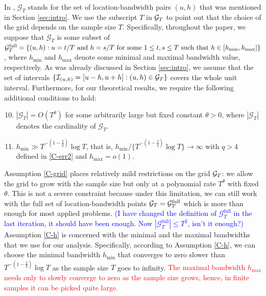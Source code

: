 \documentclass[a4paper,12pt]{article}
\makeatletter
\renewcommand{\eqref}[1]{\tagform@{\ref{#1}}}
\makeatother
\begin{document}
In \eqref{eq:Psi_hat}, $\mathcal{G}_T$ stands for the set of location-bandwidth pairs $(u, h)$ that was mentioned in Section \ref{sec:intro}. We use the subscript $T$ in $\mathcal{G}_T$ to point out that the choice of the grid depends on the sample size $T$. Specifically, throughout the paper, we suppose that $\mathcal{G}_T$ is some subset of $\mathcal{G}_T^{\text{full}} = \{ (u, h): u = t/T \text{ and } h = s/T \text{ for some } 1 \le t, s \le T \text{ such that } \linebreak h \in [h_{\min},h_{\max}] \}$, where $h_{\min}$ and $h_{\max}$ denote some minimal and maximal bandwidth value, respectively. As was already discussed in Section \ref{sec:intro}, we assume that the set of intervals $\{\mathcal{I}_{(u, h)} = [u-h, u+h]: (u, h) \in \mathcal{G}_T\}$ covers the whole unit interval. Furthermore, for our theoretical results, we require the following additional conditions to hold:
\begin{enumerate}[label=(C\arabic*),leftmargin=1.05cm]
\setcounter{enumi}{9}

\item \label{C-grid} $|\mathcal{G}_T| = O(T^\theta)$ for some arbitrarily large but fixed constant $\theta > 0$, where $|\mathcal{G}_T|$ denotes the cardinality of $\mathcal{G}_T$. 

\item \label{C-h} $h_{\min} \gg T^{-(1-\frac{2}{q})} \log T$, that is, $h_{\min} / \{ T^{-(1-\frac{2}{q})} \log T \} \rightarrow \infty$ with $q > 4$ defined in \ref{C-err2} and $h_{\max} = o(1)$.

\end{enumerate}
Assumption \ref{C-grid} places relatively mild restrictions on the grid $\mathcal{G}_T$: we allow the grid to grow with the sample size but only at a polynomial rate $T^\theta$ with fixed $\theta$. This is not a severe constraint because under this limitation, we can still work with the full set of location-bandwidth points $\mathcal{G}_T = \mathcal{G}_T^{\text{full}}$ which is more than enough for most applied problems. \textcolor{blue}{(I have changed the definition of $\mathcal{G}_T^{\text{full}}$ in the last iteration, it should have been enough. Now $|\mathcal{G}_T^{\text{full}}| \leq T^2$, isn't it enough?)} Assumption \ref{C-h} is concerned with the minimal and the maximal bandwidths that we use for our analysis. Specifically, according to Assumption \ref{C-h}, we can choose the minimal bandwidth $h_{\min}$ that converges to zero slower than $T^{-(1-\frac{2}{q})} \log T$ as the sample size $T$ goes to infinity. \textcolor{red}{The maximal bandwidth $h_{\max}$ needs only to slowly converge to zero as the sample size grows, hence, in finite samples it can be picked quite large.}
\end{document}
